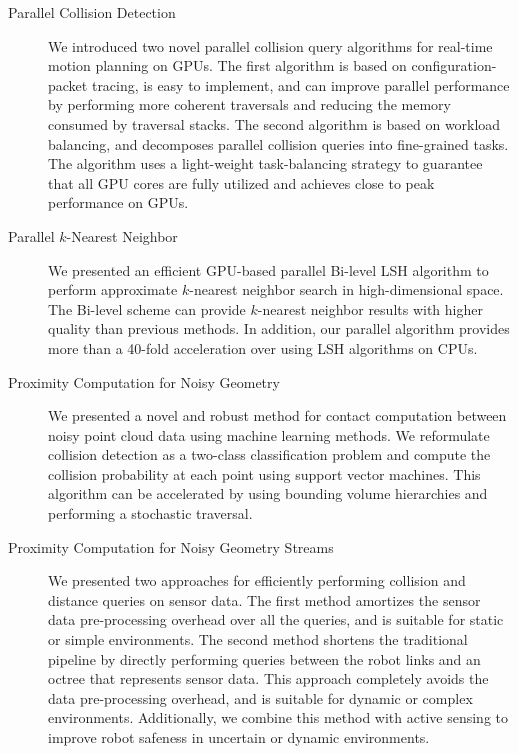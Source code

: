 \begin{description}
\item[Parallel Collision Detection] We introduced two novel parallel collision query algorithms for real-time motion planning on GPUs. The first algorithm is based on configuration-packet tracing, is easy to implement, and can improve parallel performance by performing more coherent traversals and reducing the memory consumed by traversal stacks. The second algorithm is based on workload balancing, and decomposes parallel collision queries into fine-grained tasks. The algorithm uses a light-weight task-balancing strategy to guarantee that all GPU cores are fully utilized and achieves close to peak performance on GPUs.
\item[Parallel $k$-Nearest Neighbor] We presented an efficient GPU-based parallel Bi-level LSH algorithm to perform approximate $k$-nearest neighbor search in high-dimensional space. The Bi-level scheme can provide $k$-nearest neighbor results with higher quality than previous methods. In addition, our parallel algorithm provides more than a 40-fold acceleration over using LSH algorithms on CPUs.
\item[Proximity Computation for Noisy Geometry] We presented a novel and robust method for contact computation between noisy point cloud data using machine learning methods. We reformulate collision detection as a two-class classification problem and compute the collision probability at each point using support vector machines. This algorithm can be accelerated by using bounding volume hierarchies and performing a stochastic traversal.
\item[Proximity Computation for Noisy Geometry Streams] We presented two approaches for efficiently performing collision and distance queries on sensor data. The first method amortizes the sensor data pre-processing overhead over all the queries, and is suitable for static or simple environments. The second method shortens the traditional pipeline by directly performing queries between the robot links and an octree that represents sensor data. This approach completely avoids the data pre-processing overhead, and is suitable for dynamic or complex environments. Additionally, we combine this method with active sensing to improve robot safeness in uncertain or dynamic environments.
\end{description}

